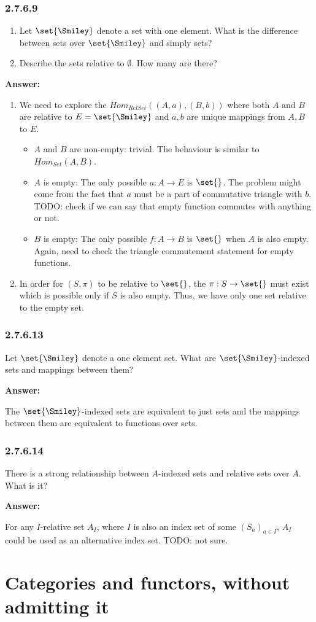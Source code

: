 \documentclass{article}
\newcommand{\vsp}[0]{\vspace*{10pt}\par}
\newcommand{\exercise}[1]{\subsubsection*{#1}}
\newcommand{\ans}[0]{\vsp\textbf{Answer: }\vsp}
\newcommand{\ei}{\item}
\newcommand{\es}{\begin{enumerate}[label=(\alph*)]\ei}
\newcommand{\ee}{\end{enumerate}}
\begin{document}
\exercise{2.7.6.9}

\es Let $\set{\Smiley}$ denote a set with one element. What is the difference
    between sets over $\set{\Smiley}$ and simply sets?
\ei Describe the sets relative to $\emptyset$. How many are there?
\ee

\ans

\es We need to explore the $Hom_{RelSet}((A,a),(B,b))$ where both $A$ and $B$
    are relative to $E=\set{\Smiley}$ and $a,b$ are unique mappings from $A,B$
    to $E$.
    \begin{itemize}
    \item $A$ and $B$ are non-empty: trivial. The behaviour is similar to
          $Hom_{Set}(A,B)$.
    \item $A$ is empty: The only possible $a:A \to E$ is $\set{}$. The problem
          might come from the fact that $a$ must be a part of commutative
          triangle with $b$. TODO: check if we can say that empty function
          commutes with anything or not.
    \item $B$ is empty: The only possible $f:A \to B$ is $\set{}$ when $A$ is
          also empty. Again, need to check the triangle commutement statement
          for empty functions.
    \end{itemize}
\ei In order for $(S,\pi)$ to be relative to $\set{}$, the $\pi:S \to \set{}$
    must exist which is possible only if $S$ is also empty. Thus, we have only
    one set relative to the empty set.
\ee

\exercise{2.7.6.13}

Let $\set{\Smiley}$ denote a one element set. What are $\set{\Smiley}$-indexed
sets and mappings between them?

\ans

The $\set{\Smiley}$-indexed sets are equivalent to just sets and the mappings
between them are equivalent to functions over sets.

\exercise{2.7.6.14}

There is a strong relationship between $A$-indexed sets and relative sets over
$A$. What is it?

\ans

For any  $I$-relative set $A_I$, where $I$ is also an index set of some
$(S_a)_{a\in I}$, $A_I$ could be used as an alternative index set. TODO: not
sure.

\section{Categories and functors, without admitting it}
\end{document}
